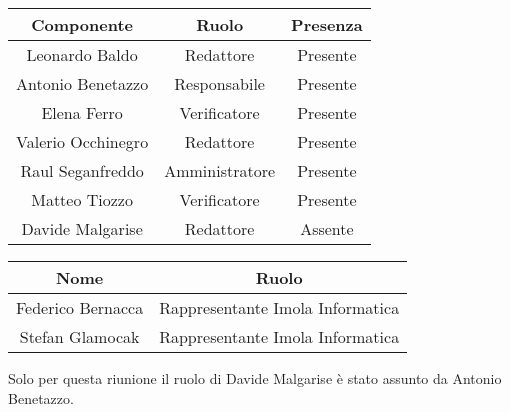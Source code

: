 \documentclass[italian,12pt]{article} %
\begin{document}
\begin{flushleft}
	\begin{table}[!h]
	\begin{tabular}{ |c|c|c| } 
		\hline
		\textbf{Componente} & \textbf{Ruolo} & \textbf{Presenza} \\
		\hline 
		Leonardo Baldo 		& Redattore & Presente \\ 
		Antonio Benetazzo 	& Responsabile & Presente \\
		Elena Ferro 		& Verificatore & Presente \\
		Valerio Occhinegro 	& Redattore & Presente \\
		Raul Seganfreddo 	& Amministratore & Presente \\
		Matteo Tiozzo 		& Verificatore & Presente \\ 
		Davide Malgarise 	& Redattore & Assente \\
		\hline
	\end{tabular}

	\vspace{1cm}

	\begin{tabular}{ |c|c| } 
		\hline
		\textbf{Nome} & \textbf{Ruolo} \\
		\hline 
		Federico Bernacca & Rappresentante Imola Informatica \\
		Stefan Glamocak & Rappresentante Imola Informatica \\

		\hline
	\end{tabular}
\end{table}
Solo per questa riunione il ruolo di Davide Malgarise è stato assunto da Antonio Benetazzo.
\end{flushleft}


\newpage
\end{document}
